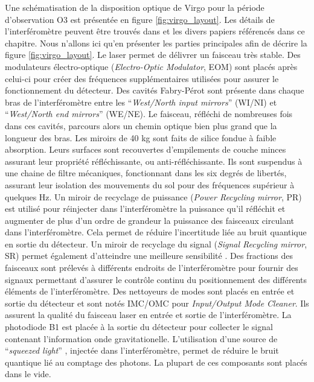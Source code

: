 Une schématisation de la disposition optique de Virgo pour la période d'observation O3 est présentée en figure \ref{fig:virgo_layout}.
Les détails de l'interféromètre peuvent être trouvés dans \cite{advanced_virgo,virgo_tech_report,virgo_phase2_tech_report} et les divers papiers référencés dans ce chapitre.
Nous n'allons ici qu'en présenter les parties principales afin de décrire la figure \ref{fig:virgo_layout}.
Le laser permet de délivrer un faisceau très stable.
Des modulateurs électro-optique (\textit{Electro-Optic Modulator}, EOM) sont placés après celui-ci pour créer des fréquences supplémentaires utilisées pour assurer le fonctionnement du détecteur.
Des cavités Fabry-Pérot sont présente dans chaque bras de l'interféromètre entre les ``\textit{West/North input mirrors}'' (WI/NI) et ``\textit{West/North end mirrors}'' (WE/NE).
Le faisceau, réfléchi de nombreuses fois dans ces cavités, parcours alors un chemin optique bien plus grand que la longueur des bras.
Les miroirs de 40 kg sont faits de silice fondue à faible absorption. Leurs surfaces sont recouvertes d’empilements de couche minces assurant leur propriété réfléchissante, ou anti-réfléchissante. Ils sont suspendus à une chaine de filtre mécaniques, fonctionnant dans les six degrés de libertés, assurant leur isolation des mouvements du sol pour des fréquences supérieur à quelques Hz.
Un miroir de recyclage de puissance (\textit{Power Recycling mirror}, PR) est utilisé pour réinjecter dans l’interféromètre la puissance qu’il réfléchit et augmenter de plus d’un ordre de grandeur la puissance des faisceaux circulant dans l’interféromètre.
Cela permet de réduire l'incertitude liée au bruit quantique en sortie du détecteur.
Un miroir de recyclage du signal (\textit{Signal Recycling mirror}, SR) permet également d'atteindre une meilleure sensibilité \cite{recycling1,recycling2}.
Des fractions des faisceaux sont prélevés à différents endroits de l’interféromètre pour fournir des signaux permettant d’assurer le contrôle continu du positionnement des différents éléments de l’interféromètre.
Des nettoyeurs de modes sont placés en entrée et sortie du détecteur et sont notés IMC/OMC pour \textit{Input/Output Mode Cleaner}.
Ils assurent la qualité du faisceau laser en entrée et sortie de l'interféromètre.
La photodiode B1 est placée à la sortie du détecteur pour collecter le signal contenant l'information onde gravitationelle.
L'utilisation d'une source de ``\textit{squeezed light}'' \cite{squeezer}, injectée dans l'interféromètre, permet de réduire le bruit quantique lié au comptage des photons.
La plupart de ces composants sont placés dans le vide.
